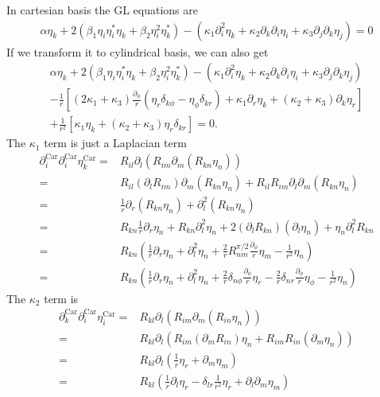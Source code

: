 \documentclass[aps,prl,preprint]{revtex4-2}
\begin{document}
In cartesian basis the GL equations are
\begin{align}
    \alpha\eta_k+2(\beta_1\eta_i\eta_i^*\eta_k
    +\beta_2\eta_i^2\eta_k^*)-\left(\kappa_1\partial_i^2\eta_k
    +\kappa_2\partial_k\partial_i\eta_i
    +\kappa_3\partial_j\partial_k\eta_j\right)=0
\end{align}
If we transform it to cylindrical basis, we can also get
\begin{align}\label{GL-cylin}
    \alpha\eta_k+2(\beta_1\eta_i\eta_i^*\eta_k
    +\beta_2\eta_i^2\eta_k^*)-\left(\kappa_1\partial_i^2\eta_k
    +\kappa_2\partial_k\partial_i\eta_i
    +\kappa_3\partial_j\partial_k\eta_j\right)\nonumber\\
    -\frac{1}{r}\left[(2\kappa_1+\kappa_3)\frac{\partial_\phi}{r}
    \left(\eta_r\delta_{k\phi}-\eta_\phi\delta_{kr}\right)+\kappa_1\partial_r\eta_k
    +(\kappa_2+\kappa_3)\partial_k\eta_r\right]\nonumber\\
    +\frac{1}{r^2}[\kappa_1\eta_k+(\kappa_2+\kappa_3)\eta_r\delta_{kr}]
    =0.
\end{align}
The $\kappa_1$ term is just a Laplacian term
\begin{align}
    \partial_i^\text{Car}\partial_i^\text{Car}\eta_k^\text{Car}=&R_{il}\partial_l(R_{im}\partial_m(R_{kn}\eta_n))\\
    =&R_{il}(\partial_lR_{im})\partial_m(R_{kn}\eta_n) + R_{il}R_{im}\partial_l\partial_m(R_{kn}\eta_n)\\
    =&\frac{1}{r}\partial_r(R_{kn}\eta_n) + \partial_l^2(R_{kn}\eta_n)\\
    =&R_{kn}\frac{1}{r}\partial_r\eta_n + R_{kn}\partial_l^2\eta_n + 2(\partial_lR_{kn})(\partial_l\eta_n)
    + \eta_n\partial_l^2R_{kn}\\
    =&R_{kn}\left(\frac{1}{r}\partial_r\eta_n + \partial_l^2\eta_n + \frac{2}{r}R^{\pi/2}_{nm}\frac{\partial_\phi}{r}\eta_m
    -\frac{1}{r^2}\eta_n\right)\\
    =&R_{kn}\left(\frac{1}{r}\partial_r\eta_n + \partial_l^2\eta_n + \frac{2}{r}\delta_{n\phi}\frac{\partial_\phi}{r}\eta_r
    -\frac{2}{r}\delta_{nr}\frac{\partial_\phi}{r}\eta_\phi - \frac{1}{r^2}\eta_n\right)
\end{align}
The $\kappa_2$ term is
\begin{align}
    \partial_k^\text{Car}\partial_i^\text{Car}\eta_i^\text{Car}=&R_{kl}\partial_l(R_{im}\partial_m(R_{in}\eta_n))\\
    =&R_{kl}\partial_l(R_{im}(\partial_mR_{in})\eta_n + R_{im}R_{in}(\partial_m\eta_n))\\
    =&R_{kl}\partial_l\left(\frac{1}{r}\eta_r + \partial_m\eta_m\right)\\
    =&R_{kl}\left(\frac{1}{r}\partial_l\eta_r - \delta_{lr}\frac{1}{r^2}\eta_r
    + \partial_l\partial_m\eta_m\right)
\end{align}
\end{document}
